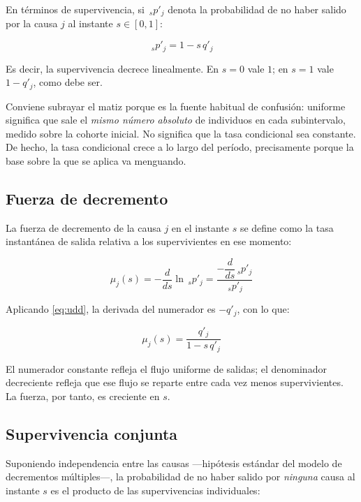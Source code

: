 \documentclass[a4paper, 12pt]{article}
\begin{document}
En términos de supervivencia, si $\,_sp'_j$ denota la probabilidad de no haber salido por la causa $j$ al instante $s \in [0,1]$:

\begin{equation}
\,_sp'_j = 1 - s\,q'_j
\label{eq:udd}
\end{equation}

Es decir, la supervivencia decrece linealmente. En $s=0$ vale $1$; en $s=1$ vale $1-q'_j$, como debe ser.

Conviene subrayar el matiz porque es la fuente habitual de confusión: uniforme significa que sale el \emph{mismo número absoluto} de individuos en cada subintervalo, medido sobre la cohorte inicial. No significa que la tasa condicional sea constante. De hecho, la tasa condicional crece a lo largo del período, precisamente porque la base sobre la que se aplica va menguando.

\subsection{Fuerza de decremento}

La fuerza de decremento de la causa $j$ en el instante $s$ se define como la tasa instantánea de salida relativa a los supervivientes en ese momento:

\begin{equation}
\mu_j(s) = -\frac{d}{ds}\ln \,_sp'_j = \frac{-\dfrac{d}{ds}\,_sp'_j}{\,_sp'_j}
\end{equation}

Aplicando \eqref{eq:udd}, la derivada del numerador es $-q'_j$, con lo que:

\begin{equation}
\mu_j(s) = \frac{q'_j}{1 - s\,q'_j}
\label{eq:fuerza}
\end{equation}

El numerador constante refleja el flujo uniforme de salidas; el denominador decreciente refleja que ese flujo se reparte entre cada vez menos supervivientes. La fuerza, por tanto, es creciente en $s$.

\subsection{Supervivencia conjunta}

Suponiendo independencia entre las causas —hipótesis estándar del modelo de decrementos múltiples—, la probabilidad de no haber salido por \emph{ninguna} causa al instante $s$ es el producto de las supervivencias individuales:
\end{document}
